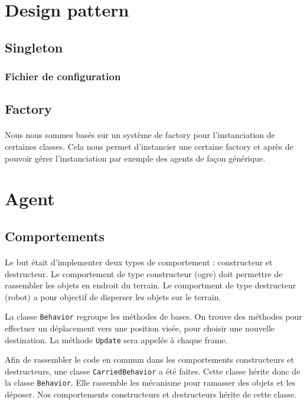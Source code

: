\section{Design pattern}

\subsection{Singleton}

\subsubsection{Fichier de configuration}

\subsection{Factory}
\paragraph{}Nous nous sommes basés sur un système de factory pour l'instanciation de
certaines classes. Cela nous permet d'instancier une certaine factory et après
de pouvoir gérer l'instanciation par exemple des agents de façon
générique. 

\section{Agent}


\subsection{Comportements}
\paragraph{}Le but était d'implementer deux types de comportement :
constructeur et destructeur. Le
comportement de type constructeur (ogre) doit permettre de rassembler les objets
en endroit du terrain. Le comportment de type destructeur (robot) a pour
objectif de disperser les objets sur le terrain.

La classe \texttt{Behavior} regroupe les méthodes de bases. On trouve des
méthodes pour effectuer un déplacement vers une position visée, pour choisir
une nouvelle destination. La méthode \texttt{Update} sera appelée à chaque frame.

Afin de rassembler le code en commun dans les comportements constructeurs et
destructeurs, une classe \texttt{CarriedBehavior} a été faites. Cette classe
hérite donc de la classe \texttt{Behavior}.  Elle rassemble les mécanisme pour
ramasser des objets et les déposer. Nos comportements constructeurs et destructeurs 
hérite de cette classe.


